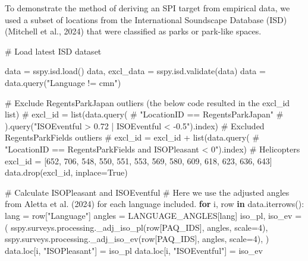 \documentclass[
  authoryear,
  preprint,
  3p]{elsarticle}
\newenvironment{Shaded}{\begin{snugshade}}{\end{snugshade}}
\newcommand{\CommentTok}[1]{\textcolor[rgb]{0.37,0.37,0.37}{#1}}
\newcommand{\ControlFlowTok}[1]{\textcolor[rgb]{0.00,0.23,0.31}{\textbf{#1}}}
\newcommand{\DecValTok}[1]{\textcolor[rgb]{0.68,0.00,0.00}{#1}}
\newcommand{\KeywordTok}[1]{\textcolor[rgb]{0.00,0.23,0.31}{\textbf{#1}}}
\newcommand{\NormalTok}[1]{\textcolor[rgb]{0.00,0.23,0.31}{#1}}
\newcommand{\OperatorTok}[1]{\textcolor[rgb]{0.37,0.37,0.37}{#1}}
\newcommand{\StringTok}[1]{\textcolor[rgb]{0.13,0.47,0.30}{#1}}
\newcommand{\VariableTok}[1]{\textcolor[rgb]{0.07,0.07,0.07}{#1}}
\begin{document}
To demonstrate the method of deriving an SPI target from empirical data,
we used a subset of locations from the International Soundscape Database
(ISD) (Mitchell et al., 2024) that were classified as parks or park-like
spaces.

\begin{Shaded}
\begin{Highlighting}[]
\CommentTok{\# Load latest ISD dataset}

\NormalTok{data }\OperatorTok{=}\NormalTok{ sspy.isd.load()}
\NormalTok{data, excl\_data }\OperatorTok{=}\NormalTok{ sspy.isd.validate(data)}
\NormalTok{data }\OperatorTok{=}\NormalTok{ data.query(}\StringTok{"Language != \textquotesingle{}cmn\textquotesingle{}"}\NormalTok{)}

\CommentTok{\# Exclude RegentsParkJapan outliers (the below code resulted in the \textasciigrave{}excl\_id\textasciigrave{} list)}
\CommentTok{\# excl\_id = list(data.query(}
    \CommentTok{\# "LocationID == \textquotesingle{}RegentsParkJapan\textquotesingle{}"}
    \CommentTok{\# ).query("ISOEventful \textgreater{} 0.72 | ISOEventful \textless{} {-}0.5").index)}
\CommentTok{\# Excluded RegentsParkFields outliers}
\CommentTok{\# excl\_id = excl\_id + list(data.query(}
    \CommentTok{\# "LocationID == \textquotesingle{}RegentsParkFields\textquotesingle{} and ISOPleasant \textless{} 0").index) \# Helicopters}
\NormalTok{excl\_id }\OperatorTok{=}\NormalTok{ [}\DecValTok{652}\NormalTok{, }\DecValTok{706}\NormalTok{, }\DecValTok{548}\NormalTok{, }\DecValTok{550}\NormalTok{, }\DecValTok{551}\NormalTok{, }\DecValTok{553}\NormalTok{, }\DecValTok{569}\NormalTok{, }\DecValTok{580}\NormalTok{, }\DecValTok{609}\NormalTok{, }\DecValTok{618}\NormalTok{, }\DecValTok{623}\NormalTok{, }\DecValTok{636}\NormalTok{, }\DecValTok{643}\NormalTok{]}
\NormalTok{data.drop(excl\_id, inplace}\OperatorTok{=}\VariableTok{True}\NormalTok{)}

\CommentTok{\# Calculate ISOPleasant and ISOEventful}
\CommentTok{\# Here we use the adjusted angles from Aletta et al. (2024) for each language included.}
\ControlFlowTok{for}\NormalTok{ i, row }\KeywordTok{in}\NormalTok{ data.iterrows():}
\NormalTok{    lang }\OperatorTok{=}\NormalTok{ row[}\StringTok{"Language"}\NormalTok{]}
\NormalTok{    angles }\OperatorTok{=}\NormalTok{ LANGUAGE\_ANGLES[lang]}
\NormalTok{    iso\_pl, iso\_ev }\OperatorTok{=}\NormalTok{ (}
\NormalTok{        sspy.surveys.processing.\_adj\_iso\_pl(row[PAQ\_IDS], angles, scale}\OperatorTok{=}\DecValTok{4}\NormalTok{),}
\NormalTok{        sspy.surveys.processing.\_adj\_iso\_ev(row[PAQ\_IDS], angles, scale}\OperatorTok{=}\DecValTok{4}\NormalTok{),}
\NormalTok{    )}
\NormalTok{    data.loc[i, }\StringTok{"ISOPleasant"}\NormalTok{] }\OperatorTok{=}\NormalTok{ iso\_pl}
\NormalTok{    data.loc[i, }\StringTok{"ISOEventful"}\NormalTok{] }\OperatorTok{=}\NormalTok{ iso\_ev}
\end{Highlighting}
\end{Shaded}
\end{document}
